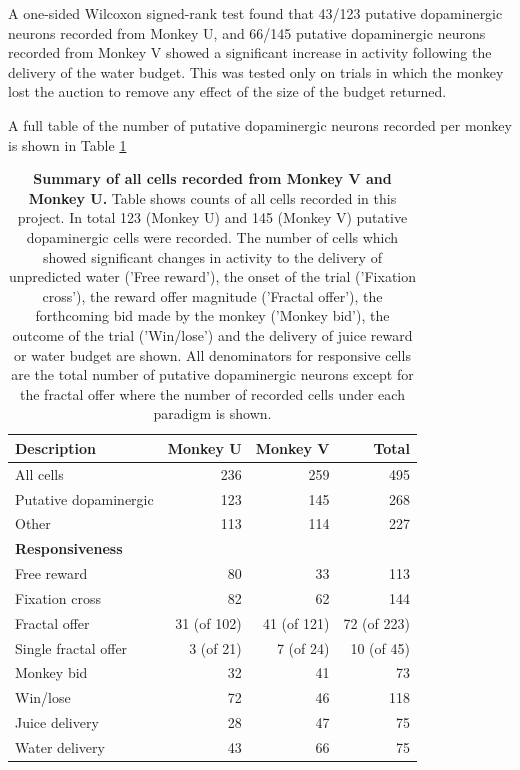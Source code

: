 A one-sided Wilcoxon signed-rank test found that 43/123 putative dopaminergic neurons recorded from Monkey U, and 66/145 putative dopaminergic neurons recorded from Monkey V showed a significant increase in activity following the delivery of the water budget. This was tested only on trials in which the monkey lost the auction to remove any effect of the size of the budget returned.

A full table of the number of putative dopaminergic neurons recorded per monkey is shown in Table \ref{tab:all_cells_significance}

\begin{table}[htbp]
\centering
\label{tab:monkey_data}
\begin{tabular}{lrrr}
\hline
\textbf{Description} & \textbf{Monkey U} & \textbf{Monkey V} & \textbf{Total} \\
\hline
All cells & 236 & 259 & 495 \\
Putative dopaminergic & 123 & 145 & 268 \\
Other & 113 & 114 & 227 \\
\hline
\textbf{Responsiveness} & & & \\
Free reward & 80 & 33 & 113 \\
Fixation cross & 82 & 62 & 144 \\
Fractal offer & 31 (of 102) & 41 (of 121) & 72 (of 223) \\
Single fractal offer & 3 (of 21) & 7 (of 24) & 10 (of 45) \\
Monkey bid & 32 & 41 & 73 \\
Win/lose & 72 & 46 & 118 \\
Juice delivery & 28 & 47 & 75 \\
Water delivery & 43 & 66 & 75 \\
\hline
\end{tabular}
\caption[Summary of all cells recorded from Monkey V and Monkey U.]{\textbf{Summary of all cells recorded from Monkey V and Monkey U.} Table shows counts of all cells recorded in this project. In total 123 (Monkey U) and 145 (Monkey V) putative dopaminergic cells were recorded. The number of cells which showed significant changes in activity to the delivery of unpredicted water ('Free reward'), the onset of the trial ('Fixation cross'), the reward offer magnitude ('Fractal offer'), the forthcoming bid made by the monkey ('Monkey bid'), the outcome of the trial ('Win/lose') and the delivery of juice reward or water budget are shown. All denominators for responsive cells are the total number of putative dopaminergic neurons except for the fractal offer where the number of recorded cells under each paradigm is shown.}
\label{tab:all_cells_significance}
\end{table}